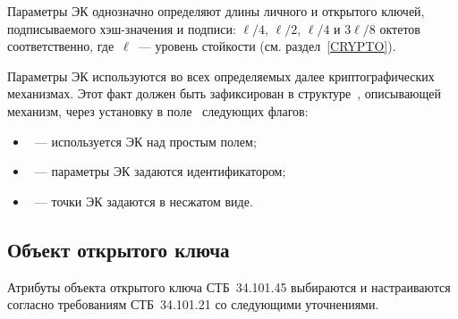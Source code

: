 Параметры ЭК однозначно определяют длины личного и открытого ключей,
подписываемого хэш-значения и подписи: $\ell/4$, $\ell/2$, $\ell/4$ и $3\ell/8$
октетов соответственно, где~$\ell$~--- уровень стойкости (см.
раздел~\ref{CRYPTO}).

Параметры ЭК используются во всех определяемых далее криптографических 
механизмах. Этот факт должен быть зафиксирован в 
структуре~, описывающей механизм,  
через установку в поле~ следующих флагов:
\begin{itemize}
\item
{}~--- используется ЭК над простым полем;
\item
{}~--- параметры ЭК задаются идентификатором;
\item
{}~--- точки ЭК задаются в несжатом виде.
\end{itemize}

\subsection{Объект открытого ключа}\label{CRYPTOKI.Pubkey}

Атрибуты объекта открытого ключа СТБ~34.101.45 
выбираются и настраиваются согласно требованиям СТБ~34.101.21 
со следующими уточнениями.

